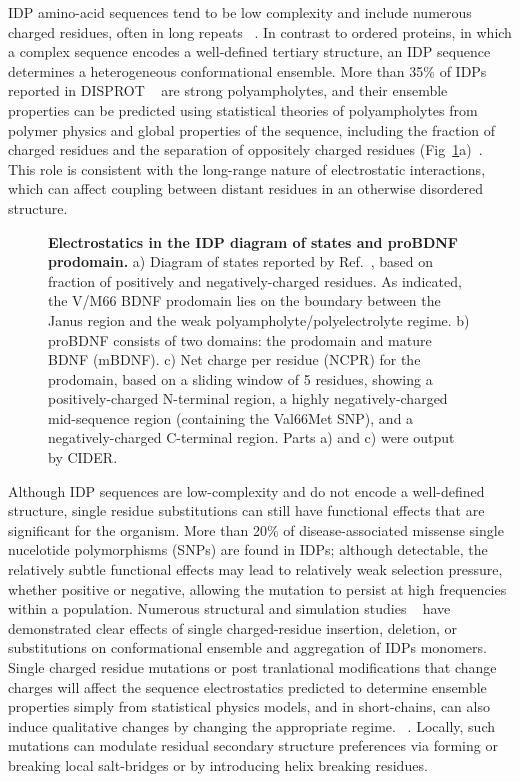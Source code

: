 \documentclass[10pt,letterpaper]{article}
\begin{document}
IDP amino-acid sequences tend to be low complexity and include numerous charged residues, often in long repeats ~\cite{Uversky2013a}. In contrast to ordered proteins, in which a complex sequence encodes a well-defined tertiary structure, an IDP sequence determines a heterogeneous conformational ensemble.  More than 35\% of 
IDPs reported in DISPROT ~\cite {Sickmeier2007a} are strong polyampholytes, and their ensemble properties can be predicted using statistical theories of polyampholytes from polymer physics and global properties of the sequence, including the fraction of charged residues and the separation of oppositely charged residues (Fig~\ref{fig1}a)~\cite{Das2015,Das2013a}.  This role is consistent with the long-range nature of electrostatic interactions, which can affect coupling between distant residues in an otherwise disordered structure.  


\begin{figure}[!ht]
\caption{{\bf Electrostatics in the IDP diagram of states and proBDNF prodomain.} 
a) Diagram of states reported by Ref.~\cite {Das2015,Das2013a}, based on fraction of positively and negatively-charged residues.  As indicated, the V/M66 BDNF prodomain lies on the boundary between the Janus region and the weak polyampholyte/polyelectrolyte regime. b) proBDNF consists of two domains: the prodomain and mature BDNF (mBDNF). %
c) Net charge per residue (NCPR) for the prodomain, based on a sliding window of 5 residues, showing a positively-charged N-terminal region, a highly negatively-charged mid-sequence region (containing the Val66Met SNP), and a negatively-charged C-terminal region. Parts a) and c) were output by CIDER. ~\cite {Holehouse2017} }
\label{fig1} 
\end{figure}

Although IDP sequences are low-complexity and do not encode a well-defined structure, single residue substitutions can still have functional effects that are significant for the organism.  More than 20\% of disease-associated missense single nucelotide polymorphisms (SNPs) are found in IDPs;\cite{Vacic2012a} although detectable, the relatively subtle functional effects may lead to relatively weak selection pressure, whether positive or negative, allowing the mutation to persist at high frequencies within a population.  Numerous structural and simulation studies ~\cite{Larini2013b,Ganguly2015,Viet2014a,Viet2013,Truong2014a,Zhan2013a,Xu2013a} have demonstrated clear effects of single charged-residue insertion, deletion, or substitutions on conformational ensemble and aggregation of IDPs monomers. Single charged residue mutations or post tranlational modifications that change charges will affect the sequence electrostatics %
predicted to determine ensemble properties simply from statistical physics models, and in short-chains, can also induce qualitative changes by changing the appropriate regime. ~\cite{Das2015,Larini2013b,Bah2016,He2015}. 
Locally, such mutations can modulate residual secondary structure preferences via forming or breaking local salt-bridges or by introducing helix breaking residues. ~\cite{AlexanderConicella2016,Ganguly2015,Zhan2013a}
  
\end{document}
